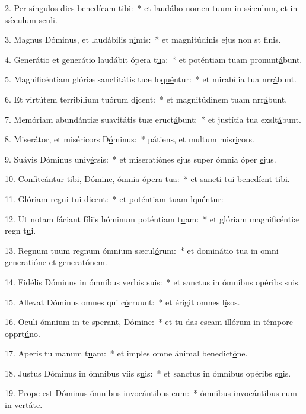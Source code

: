 2. Per síngulos dies benedícam t\uline{i}bi:~* et laudábo nomen tuum in sǽculum, et in sǽculum sc\uline{u}li.\par 
3. Magnus Dóminus, et laudábilis n\uline{i}mis:~* et magnitúdinis ejus non st f\uline{i}nis.\par 
4. Generátio et generátio laudábit ópera t\uline{u}a:~* et poténtiam tuam pronunt\uline{á}bunt.\par 
5. Magnificéntiam glóriæ sanctitátis tuæ lo\uline{qué}ntur:~* et mirabília tua nrr\uline{á}bunt.\par 
6. Et virtútem terribílium tuórum d\uline{i}cent:~* et magnitúdinem tuam nrr\uline{á}bunt.\par 
7. Memóriam abundántiæ suavitátis tuæ eruct\uline{á}bunt:~* et justítia tua exslt\uline{á}bunt.\par 
8. Miserátor, et miséricors D\uline{ó}minus:~* pátiens, et multum misr\uline{i}cors.\par 
9. Suávis Dóminus univ\uline{é}rsis:~* et miseratiónes ejus super ómnia óper \uline{e}jus.\par 
10. Confiteántur tibi, Dómine, ómnia ópera t\uline{u}a:~* et sancti tui benedícnt t\uline{i}bi.\par 
11. Glóriam regni tui d\uline{i}cent:~* et poténtiam tuam l\uline{qué}ntur:\par 
12. Ut notam fáciant fíliis hóminum poténtiam t\uline{u}am:~* et glóriam magnificéntiæ regn t\uline{u}i.\par 
13. Regnum tuum regnum ómnium sæcul\uline{ó}rum:~* et dominátio tua in omni generatióne et generat\uline{ó}nem.\par 
14. Fidélis Dóminus in ómnibus verbis s\uline{u}is:~* et sanctus in ómnibus opéribs s\uline{u}is.\par 
15. Allevat Dóminus omnes qui c\uline{ó}rruunt:~* et érigit omnes l\uline{í}sos.\par 
16. Oculi ómnium in te sperant, D\uline{ó}mine:~* et tu das escam illórum in témpore opprt\uline{ú}no.\par 
17. Aperis tu manum t\uline{u}am:~* et imples omne ánimal benedict\uline{ó}ne.\par 
18. Justus Dóminus in ómnibus viis s\uline{u}is:~* et sanctus in ómnibus opéribs s\uline{u}is.\par 
19. Prope est Dóminus ómnibus invocántibus \uline{e}um:~* ómnibus invocántibus eum in vert\uline{á}te.\par 
